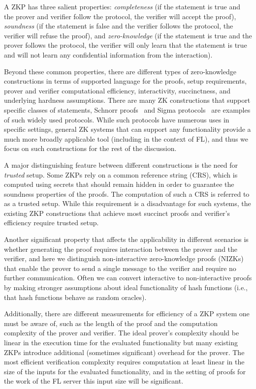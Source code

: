 \documentclass[11pt]{article}
\begin{document}
A ZKP has three salient properties: \emph{completeness} (if the statement is true and the prover and verifier follow the protocol, the verifier will accept the proof), \emph{soundness} (if the statement is false and the verifier follows the protocol, the verifier will refuse the proof), and \emph{zero-knowledge} (if the statement is true and the prover follows the protocol, the verifier will only learn that the statement is true and will not learn any confidential information from the interaction).

Beyond these common properties, there are different types of zero-knowledge constructions in terms of supported language for the proofs, setup requirements, prover and verifier computational efficiency, interactivity, succinctness, and underlying hardness assumptions. There are many ZK constructions that support specific classes of statements, Schnorr proofs~\cite{Schnorr:1990:EIS:111563.111628} and Sigma protocols~\cite{DamgaardSigma} are examples of such widely used protocols. While such protocols have numerous uses in specific settings, general ZK systems that can support any functionality provide a much more broadly applicable tool (including in the context of FL), and thus we focus on such constructions for the rest of the discussion.

A major distinguishing feature between different constructions is the need for \emph{trusted} setup. Some ZKPs rely on a common reference string (CRS), which is computed using secrets that should remain hidden in order to guarantee the soundness properties of the proofs. The computation of such a CRS is referred to as a trusted setup. While this requirement is a disadvantage for such systems, the existing ZKP constructions that achieve most succinct proofs and verifier's efficiency require trusted setup. 

Another significant property that affects the applicability in different scenarios is whether generating the proof requires interaction between the prover and the verifier, and here we distinguish non-interactive zero-knowledge proofs (NIZKs) that enable the prover to send a single message to the verifier and require no further communication. Often we can convert interactive to non-interactive proofs by making stronger assumptions about ideal functionality of hash functions (i.e., that hash functions behave as random oracles).

Additionally, there are different measurements for efficiency of a ZKP system one must be aware of, such as the length of the proof and the computation complexity of the prover and verifier. The ideal prover's complexity should be linear in the execution time for the evaluated functionality but many existing ZKPs introduce additional (sometimes significant) overhead for the prover. The most efficient verification complexity requires computation at least linear in the size of the inputs for the evaluated functionality, and in the setting of proofs for the work of the FL server this input size will be significant.
\end{document}

